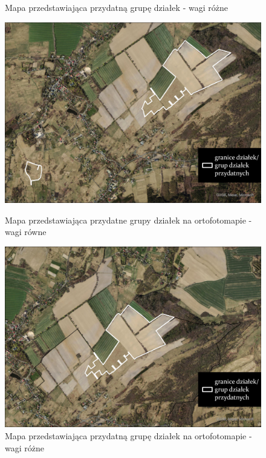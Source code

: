 \documentclass{article}
\begin{document}
\begin{figure}[H]
\begin{minipage}[t]{0.48\textwidth}
        \caption{Mapa przedstawiająca przydatną grupę działek - wagi różne}
        \label{fig:przydatne-dzialki-rozne}
    \end{minipage}
\end{figure}


\begin{figure}[H]
    \begin{minipage}[t]{0.48\textwidth}
        \centering
        \includegraphics[width=\linewidth]{img/dzialki-przydatne-ortofoto.jpg}
        \caption{Mapa przedstawiająca przydatne grupy działek na ortofotomapie - wagi równe}
        \label{fig:dzialki-ortofoto-rowne}
    \end{minipage}
    \hfill
    \begin{minipage}[t]{0.48\textwidth}
        \centering
        \includegraphics[width=\linewidth]{img/roznewagi-dzialki-przydatne-ortofoto.jpg}
        \caption{Mapa przedstawiająca przydatną grupę działek na ortofotomapie - wagi różne}
        \label{fig:dzialki-ortofoto-rozne}
    \end{minipage}
\end{figure}
\end{document}
